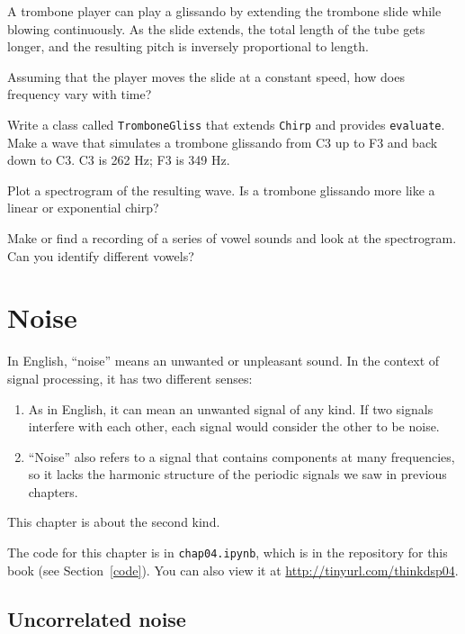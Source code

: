 \documentclass[12pt]{book}
\begin{document}
\begin{exercise}
A trombone player can play a glissando by extending the trombone
slide while blowing continuously.  As the slide extends, the total
length of the tube gets longer, and the resulting pitch is inversely
proportional to length.

Assuming that the player moves the slide at a constant speed, how
does frequency vary with time?

Write a class called {\tt TromboneGliss} that extends {\tt Chirp} and
provides {\tt evaluate}.  Make a wave that simulates a trombone
glissando from C3 up to F3 and back down to C3.  C3 is 262 Hz; F3 is
349 Hz.

Plot a spectrogram of the resulting wave.  Is a trombone glissando
more like a linear or exponential chirp?
\end{exercise}


\begin{exercise}
Make or find a recording of a series of vowel sounds and look at the
spectrogram.  Can you identify different vowels?
\end{exercise}


\chapter{Noise}

In English, ``noise'' means an unwanted or unpleasant sound.  In the
context of signal processing, it has two different senses:

\begin{enumerate}

\item As in English, it can mean an unwanted signal of any kind.  If
two signals interfere with each other, each signal would consider
the other to be noise.

\item ``Noise'' also refers to a signal that contains components at
many frequencies, so it lacks the harmonic structure of the periodic
signals we saw in previous chapters.

\end{enumerate}

This chapter is about the second kind.

The code for this chapter is in {\tt chap04.ipynb}, which is in the
repository for this book (see Section~\ref{code}).
You can also view it at \url{http://tinyurl.com/thinkdsp04}.


\section{Uncorrelated noise}
\end{document}
